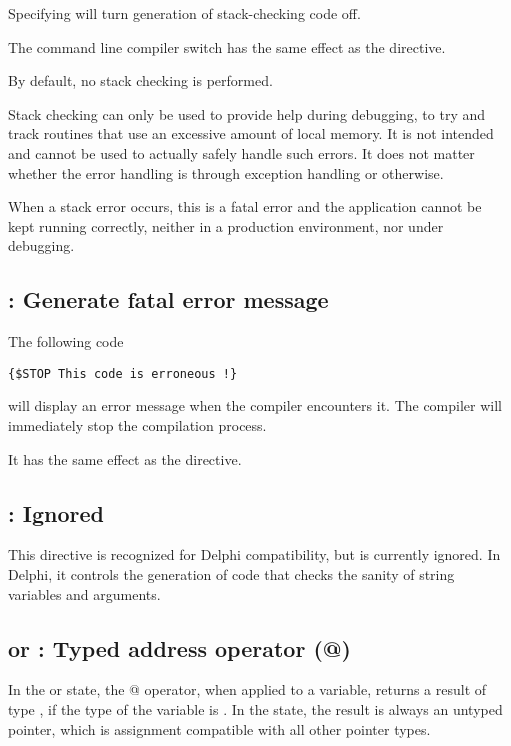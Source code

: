 Specifying  will turn generation of stack-checking code off.

The command line compiler switch  has the same effect as the
 directive.

By default, no stack checking is performed.

\begin{remark}
Stack checking can only be used to provide help during debugging, to try and 
track routines that use an excessive amount of local memory. It is not
intended and cannot be used to actually safely handle such errors.
It does not matter whether the error handling is through exception 
handling or otherwise.

When a stack error occurs, this is a fatal error and the application cannot 
be kept running correctly, neither in a production environment, nor under 
debugging. 
\end{remark}


\subsection{ : Generate fatal error message}

The following code
\begin{verbatim}
{$STOP This code is erroneous !}
\end{verbatim}
will display an error message when the compiler encounters it.
The compiler will immediately stop the compilation process.

It has the same effect as the  directive.

\subsection{ : Ignored}
This directive is recognized for Delphi compatibility, but is currently
ignored. In Delphi, it controls the generation of code that checks the
sanity of string variables and arguments.

\subsection{ or  : Typed address operator (@)}

In the  or  state, the @ operator,
when applied to a variable, returns a result of type , if the
type of the variable is . In the  state, the result is
always an untyped pointer, which is assignment compatible with all other
pointer types.

